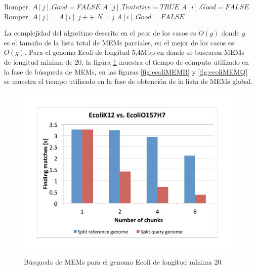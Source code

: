 \documentclass[12pt,a4paper]{article}
\begin{document}
\begin{algorithmic}
                      \STATE Romper.
                  \ENDIF
                      \STATE $A[j].Good=FALSE$
                  \ENDIF
              \ELSE
                      \STATE $A[j].Tentative=TRUE$
                          \STATE $A[i].Good=FALSE$
                          \STATE Romper.
                      \ENDIF
                  \ENDIF
              \ENDIF
          \ENDIF
      \ENDFOR
  \ENDFOR
              \STATE $A[j]=A[i]$
          \ENDIF
          \STATE $j++$
      \ENDIF
  \ENDFOR
  \STATE $N=j$
      \STATE $A[i].Good=FALSE$
  \ENDFOR
\end{algorithmic}
\indent
La complejidad del algoritmo descrito en el peor de los casos es $O(g)$ donde $g$ es el tamaño de la lista total de MEMs parciales, en el mejor de los casos es $O(g)$. Para el genoma Ecoli de longitud 5,4Mbp en donde se buscaron MEMs de longitud mínima de 20, la figura \ref{fig:ecoliFind} muestra el tiempo de cómputo utilizado en la fase de búsqueda de MEMs, en las figuras \ref{fig:ecoliMEMR} y \ref{fig:ecoliMEMQ} se muestra el tiempo utilizado en la fase de obtención de la lista de MEMs global.\\
   \begin{figure}[h] 
   \centering 
   \includegraphics[scale=0.4]{ecoli2012.pdf} 
   \caption{Búsqueda de MEMs para el genoma Ecoli de longitud mínima 20.} 
   \label{fig:ecoliFind} 
 \end{figure}
\end{document}
